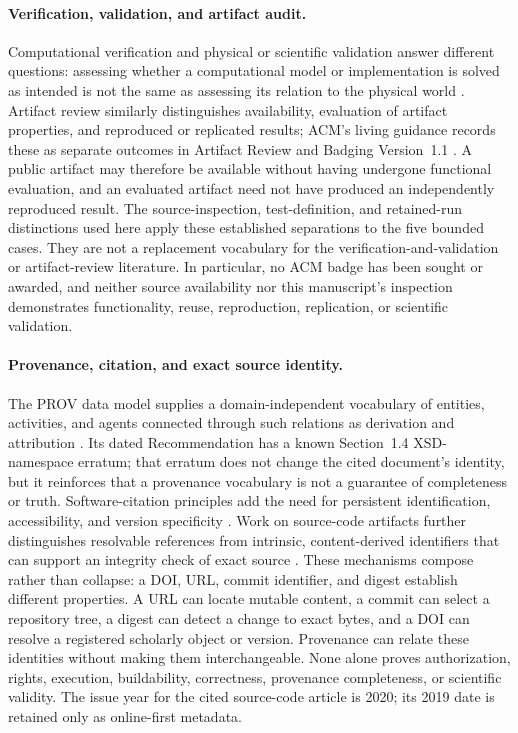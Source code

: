 \documentclass[11pt]{article}
\begin{document}
\paragraph{Verification, validation, and artifact audit.}
Computational verification and physical or scientific validation answer
different questions: assessing whether a computational model or implementation
is solved as intended is not the same as assessing its relation to the physical
world \citep{OberkampfTrucanoHirsch2004VerificationValidation}. Artifact review
similarly distinguishes availability, evaluation of artifact properties, and
reproduced or replicated results; ACM's living guidance records these as
separate outcomes in Artifact Review and Badging Version~1.1
\citep{ACM2020ArtifactReviewBadging}. A public artifact may therefore be
available without having undergone functional evaluation, and an evaluated
artifact need not have produced an independently reproduced result. The
source-inspection, test-definition, and retained-run distinctions used here
apply these established separations to
the five bounded cases. They are not a replacement vocabulary for the
verification-and-validation or artifact-review literature. In particular, no
ACM badge has been sought or awarded, and neither source availability nor this
manuscript's inspection demonstrates functionality, reuse, reproduction,
replication, or scientific validation.

\paragraph{Provenance, citation, and exact source identity.}
The PROV data model supplies a domain-independent vocabulary of entities,
activities, and agents connected through such relations as derivation and
attribution \citep{MoreauMissier2013PROVDM}. Its dated Recommendation has a
known Section~1.4 XSD-namespace erratum; that erratum does not change the cited
document's identity, but it reinforces that a provenance vocabulary is not a
guarantee of completeness or truth. Software-citation principles add the need
for persistent identification, accessibility, and version specificity
\citep{SmithEtAl2016SoftwareCitationPrinciples}. Work on source-code artifacts
further distinguishes resolvable references from intrinsic, content-derived
identifiers that can support an integrity check of exact source
\citep{DiCosmoGruenpeterZacchiroli2020SourceCodeArtifacts}. These mechanisms
compose rather than collapse: a DOI, URL, commit identifier, and digest
establish different properties. A URL can locate mutable content, a commit can
select a repository tree, a digest can detect a change to exact bytes, and a DOI
can resolve a registered scholarly object or version. Provenance can relate
these identities without making them interchangeable. None alone proves
authorization, rights,
execution, buildability, correctness, provenance completeness, or scientific
validity. The issue year for the cited source-code article is 2020; its 2019
date is retained only as online-first metadata.
\end{document}

